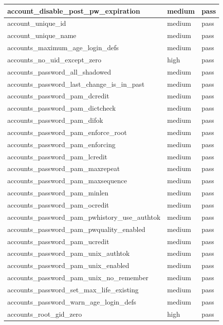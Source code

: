 \begin{longtable}{|p{10cm}|p{2cm}|p{2cm}|}
account\_disable\_post\_pw\_expiration & medium & pass \\
\hline
account\_unique\_id & medium & pass \\
\hline
account\_unique\_name & medium & pass \\
\hline
accounts\_maximum\_age\_login\_defs & medium & pass \\
\hline
accounts\_no\_uid\_except\_zero & high & pass \\
\hline
accounts\_password\_all\_shadowed & medium & pass \\
\hline
accounts\_password\_last\_change\_is\_in\_past & medium & pass \\
\hline
accounts\_password\_pam\_dcredit & medium & pass \\
\hline
accounts\_password\_pam\_dictcheck & medium & pass \\
\hline
accounts\_password\_pam\_difok & medium & pass \\
\hline
accounts\_password\_pam\_enforce\_root & medium & pass \\
\hline
accounts\_password\_pam\_enforcing & medium & pass \\
\hline
accounts\_password\_pam\_lcredit & medium & pass \\
\hline
accounts\_password\_pam\_maxrepeat & medium & pass \\
\hline
accounts\_password\_pam\_maxsequence & medium & pass \\
\hline
accounts\_password\_pam\_minlen & medium & pass \\
\hline
accounts\_password\_pam\_ocredit & medium & pass \\
\hline
accounts\_password\_pam\_pwhistory\_use\_authtok & medium & pass \\
\hline
accounts\_password\_pam\_pwquality\_enabled & medium & pass \\
\hline
accounts\_password\_pam\_ucredit & medium & pass \\
\hline
accounts\_password\_pam\_unix\_authtok & medium & pass \\
\hline
accounts\_password\_pam\_unix\_enabled & medium & pass \\
\hline
accounts\_password\_pam\_unix\_no\_remember & medium & pass \\
\hline
accounts\_password\_set\_max\_life\_existing & medium & pass \\
\hline
accounts\_password\_warn\_age\_login\_defs & medium & pass \\
\hline
accounts\_root\_gid\_zero & high & pass \\

\end{longtable}
